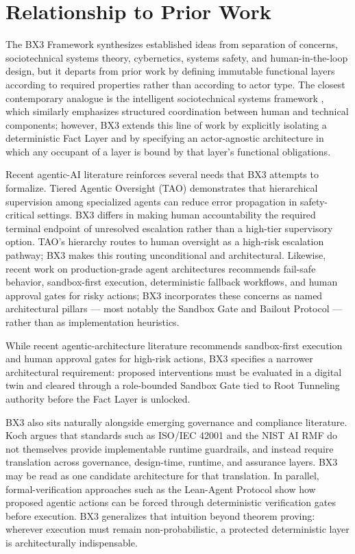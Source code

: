 \documentclass[12pt]{article}
\begin{document}
\section{Relationship to Prior Work}
\label{sec:prior}

The BX3 Framework synthesizes established ideas from separation of concerns, sociotechnical systems theory, cybernetics, systems safety, and human-in-the-loop design, but it departs from prior work by defining immutable functional layers according to required properties rather than according to actor type. The closest contemporary analogue is the intelligent sociotechnical systems framework \cite{xu2024}, which similarly emphasizes structured coordination between human and technical components; however, BX3 extends this line of work by explicitly isolating a deterministic Fact Layer and by specifying an actor-agnostic architecture in which any occupant of a layer is bound by that layer's functional obligations.

Recent agentic-AI literature reinforces several needs that BX3 attempts to formalize. Tiered Agentic Oversight (TAO) \cite{kim2025} demonstrates that hierarchical supervision among specialized agents can reduce error propagation in safety-critical settings. BX3 differs in making human accountability the required terminal endpoint of unresolved escalation rather than a high-tier supervisory option. TAO's hierarchy routes to human oversight as a high-risk escalation pathway; BX3 makes this routing unconditional and architectural. Likewise, recent work on production-grade agent architectures \cite{alenezi2026} recommends fail-safe behavior, sandbox-first execution, deterministic fallback workflows, and human approval gates for risky actions; BX3 incorporates these concerns as named architectural pillars --- most notably the Sandbox Gate and Bailout Protocol --- rather than as implementation heuristics.

While recent agentic-architecture literature recommends sandbox-first execution and human approval gates for high-risk actions, BX3 specifies a narrower architectural requirement: proposed interventions must be evaluated in a digital twin and cleared through a role-bounded Sandbox Gate tied to Root Tunneling authority before the Fact Layer is unlocked.

BX3 also sits naturally alongside emerging governance and compliance literature. Koch \cite{koch2026} argues that standards such as ISO/IEC 42001 \cite{iso2023} and the NIST AI RMF \cite{nist2023} do not themselves provide implementable runtime guardrails, and instead require translation across governance, design-time, runtime, and assurance layers. BX3 may be read as one candidate architecture for that translation. In parallel, formal-verification approaches such as the Lean-Agent Protocol \cite{rashie2026} show how proposed agentic actions can be forced through deterministic verification gates before execution. BX3 generalizes that intuition beyond theorem proving: wherever execution must remain non-probabilistic, a protected deterministic layer is architecturally indispensable.
\end{document}
